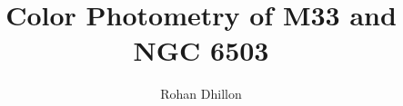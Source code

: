 \documentclass[twocolumn]{aastex631}
\begin{document}
\title{Color Photometry of M33 and NGC 6503}
\author{Rohan Dhillon}

\FloatBarrier


\end{document}
